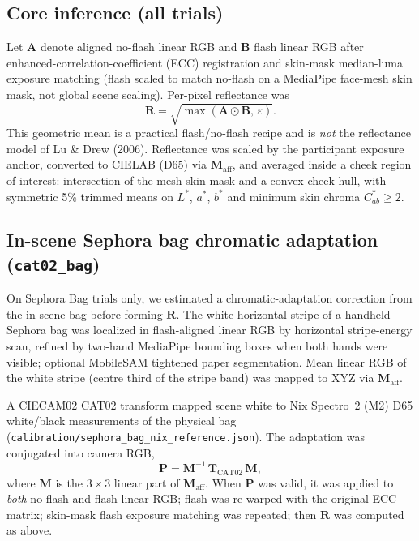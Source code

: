 \documentclass[11pt]{article}
\begin{document}
\subsection{Core inference (all trials)}

Let $\mathbf{A}$ denote aligned no-flash linear RGB and $\mathbf{B}$ flash linear RGB after enhanced-correlation-coefficient (ECC) registration and skin-mask median-luma exposure matching (flash scaled to match no-flash on a MediaPipe face-mesh skin mask, not global scene scaling). Per-pixel reflectance was
\begin{equation}
  \mathbf{R} = \sqrt{\max(\mathbf{A}\odot\mathbf{B},\,\varepsilon)}.
\end{equation}
This geometric mean is a practical flash/no-flash recipe and is \emph{not} the reflectance model of Lu \& Drew (2006). Reflectance was scaled by the participant exposure anchor, converted to CIELAB (D65) via $\mathbf{M}_{\mathrm{aff}}$, and averaged inside a cheek region of interest: intersection of the mesh skin mask and a convex cheek hull, with symmetric 5\% trimmed means on $L^*$, $a^*$, $b^*$ and minimum skin chroma $C_{ab}^*\ge 2$.

\subsection{In-scene Sephora bag chromatic adaptation (\texttt{cat02\_bag})}

On Sephora Bag trials only, we estimated a chromatic-adaptation correction from the in-scene bag before forming $\mathbf{R}$. The white horizontal stripe of a handheld Sephora bag was localized in flash-aligned linear RGB by horizontal stripe-energy scan, refined by two-hand MediaPipe bounding boxes when both hands were visible; optional MobileSAM tightened paper segmentation. Mean linear RGB of the white stripe (centre third of the stripe band) was mapped to XYZ via $\mathbf{M}_{\mathrm{aff}}$.

A CIECAM02 CAT02 transform mapped scene white to Nix Spectro~2 (M2) D65 white/black measurements of the physical bag (\texttt{calibration/sephora\_bag\_nix\_reference.json}). The adaptation was conjugated into camera RGB,
\begin{equation}
  \mathbf{P} = \mathbf{M}^{-1}\,\mathbf{T}_{\mathrm{CAT02}}\,\mathbf{M},
\end{equation}
where $\mathbf{M}$ is the $3\times3$ linear part of $\mathbf{M}_{\mathrm{aff}}$. When $\mathbf{P}$ was valid, it was applied to \emph{both} no-flash and flash linear RGB; flash was re-warped with the original ECC matrix; skin-mask flash exposure matching was repeated; then $\mathbf{R}$ was computed as above.
\end{document}

